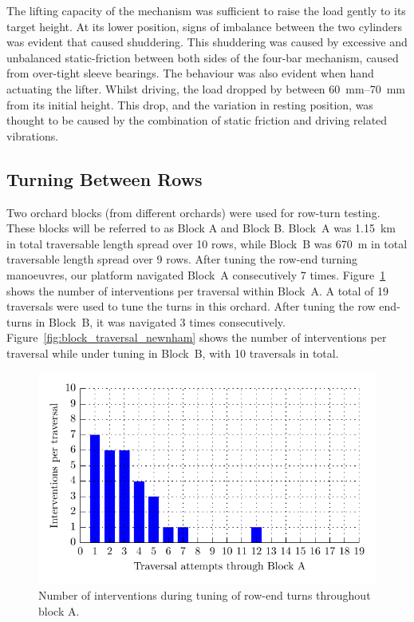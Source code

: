 \documentclass[preprint,authoryear,12pt]{elsarticle}
\begin{document}
    The lifting capacity of the mechanism was sufficient to raise the load gently to its target height.
    At its lower position, signs of imbalance between the two cylinders was evident that caused shuddering.
    This shuddering was caused by excessive and unbalanced static-friction between both sides of the four-bar mechanism, caused from over-tight sleeve bearings.
    The behaviour was also evident when hand actuating the lifter.
    Whilst driving, the load dropped by between \SIrange{60}{70}{\milli\meter} from its initial height.
    This drop, and the variation in resting position, was thought to be caused by the combination of static friction and driving related vibrations.

  \subsection{Turning Between Rows}

    Two orchard blocks (from different orchards) were used for row-turn testing.
    These blocks will be referred to as Block A and Block B.
    Block~A was \SI{1.15}{\kilo\meter} in total traversable length spread over 10 rows, while Block~B was \SI{670}{\meter} in total traversable length spread over 9 rows.
    After tuning the row-end turning manoeuvres, our platform navigated Block~A consecutively 7 times.
    Figure~\ref{fig:block_traversal_bateman} shows the number of interventions per traversal within Block~A.
    A total of 19 traversals were used to tune the turns in this orchard.
    After tuning the row end-turns in Block~B, it was navigated 3 times consecutively.
    Figure~\ref{fig:block_traversal_newnham} shows the number of interventions per traversal while under tuning in Block~B, with 10 traversals in total.

    \begin{figure}[htb]
        \centering
        \includegraphics{imgs/tuning_graphs/bateman.pdf}
        \caption{
            Number of interventions during tuning of row-end turns throughout block A.
        }
        \label{fig:block_traversal_bateman}
    \end{figure}
\end{document}
